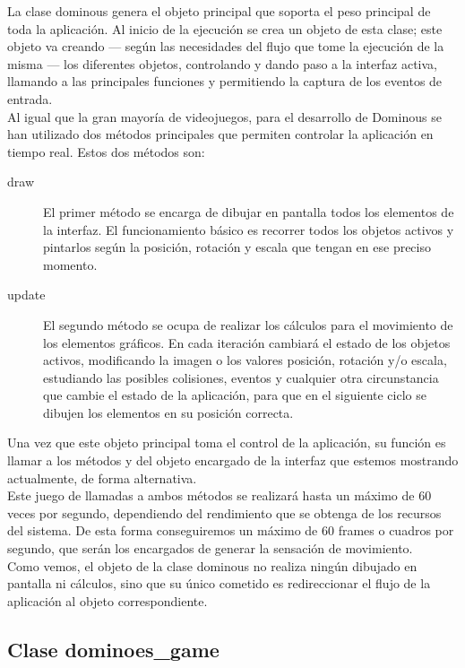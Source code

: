 La clase dominous genera el objeto principal que soporta el peso principal de toda la aplicación. Al inicio de la
ejecución se crea un objeto de esta clase; este objeto va creando --- según las necesidades del flujo que tome
la ejecución de la misma --- los diferentes objetos, controlando y dando paso a la interfaz activa, llamando a
las principales funciones y permitiendo la captura de los eventos de entrada. \\

Al igual que la gran mayoría de videojuegos, para el desarrollo de Dominous se han utilizado dos métodos principales
que permiten controlar la aplicación en tiempo real. Estos dos métodos son:
\begin{description}
    \item[draw] El primer método se encarga de dibujar en pantalla todos los elementos de la interfaz. El funcionamiento
        básico es recorrer todos los objetos activos y pintarlos según la posición, rotación y escala que tengan en
        ese preciso momento. 
    \item[update] El segundo método se ocupa de realizar los cálculos para el movimiento de los elementos gráficos. 
        En cada iteración cambiará el estado de los objetos activos, modificando la imagen o los valores posición,
        rotación y/o escala, estudiando las posibles colisiones, eventos y cualquier otra circunstancia que cambie
        el estado de la aplicación, para que en el siguiente ciclo se dibujen los elementos en su posición correcta.
\end{description}

Una vez que este objeto principal toma el control de la aplicación, su función es llamar a los métodos 
y  del objeto encargado de la interfaz que estemos mostrando actualmente, de forma alternativa. \\

Este juego de llamadas a ambos métodos se realizará hasta un máximo de 60 veces por segundo, dependiendo del rendimiento
que se obtenga de los recursos del sistema. De esta forma conseguiremos un máximo de 60 frames o cuadros por segundo,
que serán los encargados de generar la sensación de movimiento. \\

Como vemos, el objeto de la clase dominous no realiza ningún dibujado en pantalla ni cálculos, sino que su único
cometido es redireccionar el flujo de la aplicación al objeto correspondiente.

\subsection{Clase dominoes\_game}

